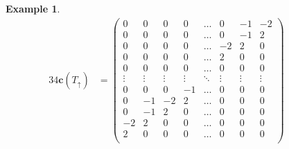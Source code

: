 \documentclass{amsart}
\theoremstyle{definition}
\newtheorem{example}[theorem]{Example}
\renewcommand{\b}[1]{{\boldsymbol{#1}}} %
\begin{document}
\begin{example}
\begin{table}
\begin{alignat*}{3}
	4\b{c}(T_\uparrow) & = \begin{pmatrix}
		0 & 0 & 0 & 0 & \dots & 0 & -1 & -2 \\
		0 & 0 & 0 & 0 & \dots & 0 & -1 & 2 \\
		0 & 0 & 0 & 0 & \dots & -2 & 2 & 0 \\
		0 & 0 & 0 & 0 & \dots & 2 & 0 & 0 \\
		0 & 0 & 0 & 0 & \dots & 0 & 0 & 0 \\
		\vdots & \vdots & \vdots & \vdots & \ddots & \vdots & \vdots & \vdots \\
		0 & 0 & 0 & -1 & \dots & 0 & 0 & 0 \\
		0 & -1 & -2 & 2 & \dots & 0 & 0 & 0 \\
		0 & -1 & 2 & 0 & \dots & 0 & 0 & 0 \\
		-2 & 2 & 0 & 0 & \dots & 0 & 0 & 0 \\
		2 & 0 & 0 & 0 & \dots & 0 & 0 & 0 \\
	\end{pmatrix}
	\qquad &

\end{alignat*}
\end{table}
\end{example}
\end{document}
